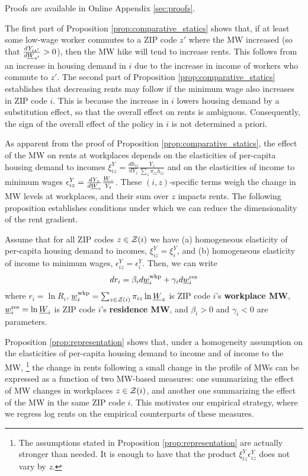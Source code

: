 Proofs are available in Online Appendix \ref{sec:proofs}.

The first part of Proposition \ref{prop:comparative_statics} shows that,
if at least some low-wage worker commutes to a ZIP code $z'$ where the MW 
increased  (so that $\frac{d Y_{iz'}}{d \underline{W}_{z'}}>0$),
then the MW hike will tend to increase rents.
This follows from an increase in housing demand in $i$ due to the increase in
income of workers who commute to $z'$.
The second part of Proposition \ref{prop:comparative_statics} establishes that 
decreasing rents may follow if the minimum wage also increases in ZIP code $i$.
This is because the increase in $i$ lowers housing demand by a substitution
effect, so that the overall effect on rents is ambiguous.
Consequently, the sign of the overall effect of the policy in $i$ is not 
determined a priori.

As apparent from the proof of Proposition \ref{prop:comparative_statics}, 
the effect of the MW on rents at workplaces depends on the elasticities of 
per-capita housing demand to incomes
$\xi^Y_{iz} = \frac{d h_{iz}}{d Y_z} \frac{Y_z}{\sum_z \pi_{iz} h_{iz}}$ and
on the elasticities of income to minimum wages
$\epsilon_{iz}^Y = \frac{d Y_z}{d \underline{W}_z} \frac{\underline{W}_z}{Y_z}$.
These $(i,z)$-specific terms weigh the change in MW levels at workplaces,
and their sum over $z$ impacts rents.
The following proposition establishes conditions under which we can reduce the 
dimensionality of the rent gradient.

\begin{prop}[Representation]\label{prop:representation}
    Assume that for all ZIP codes $z\in\mathcal{Z}(i)$ we have
    (a) homogeneous elasticity of per-capita housing demand to incomes,
    $\xi^Y_{iz}=\xi^Y_{i}$, and
    (b) homogeneous elasticity of income to minimum wages,
    $\epsilon_{iz}^Y=\epsilon_i^Y$.
    Then, we can write
    \begin{equation} \label{eq:theory_representation}
        d r_i = \beta_i  d \underline{w}^{\text{wkp}}_i
              + \gamma_i d \underline{w}^{\text{res}}_i
    \end{equation}
    where 
    $r_{i} = \ln R_i$,
    $\underline{w}_{i}^{\text{wkp}} = \sum_{z\in\mathcal{Z}(i)} \pi_{iz} \ln \underline{W}_z$ 
    is ZIP code $i$'s \textbf{workplace MW}, 
    $\underline{w}^{\text{res}}_i = \ln \underline{W}_i$ 
    is ZIP code $i$'s \textbf{residence MW}, and 
    $\beta_i > 0$ and $\gamma_i < 0$ are parameters.
\end{prop}

Proposition \ref{prop:representation} shows that, under a homogeneity assumption
on the elasticities of per-capita housing demand to income and 
of income to the MW,%
\footnote{The assumptions stated in Proposition \ref{prop:representation} are 
actually stronger than needed.
It is enough to have that the product $\xi^Y_{iz} \epsilon_{iz}^Y$ does not vary 
by $z$.}
the change in rents following a small change in the profile of MWs can be 
expressed as a function of two MW-based measures:
one summarizing the effect of MW changes in workplaces $z\in\mathcal{Z}(i)$,
and another one summarizing the effect of the MW in the same ZIP code $i$.
This motivates our empirical strategy, where we regress log rents on the 
empirical counterparts of these measures.

